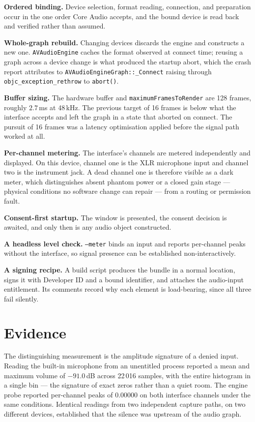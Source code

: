 \documentclass[10pt,letterpaper,twocolumn]{article}
\newcommand{\code}[1]{\texttt{#1}}
\begin{document}
\textbf{Ordered binding.} Device selection, format reading, connection, and preparation occur in the one order Core Audio accepts, and the bound device is read back and verified rather than assumed.

\textbf{Whole-graph rebuild.} Changing devices discards the engine and constructs a new one. \code{AVAudioEngine} caches the format observed at connect time; reusing a graph across a device change is what produced the startup abort, which the crash report attributes to \code{AVAudioEngine\allowbreak Graph::\allowbreak\_Connect} raising through \code{objc\_\allowbreak exception\_\allowbreak rethrow} to \code{abort()}.

\textbf{Buffer sizing.} The hardware buffer and \code{maximum\allowbreak Frames\allowbreak To\allowbreak Render} are 128 frames, roughly $2.7$\,ms at 48\,kHz. The previous target of 16 frames is below what the interface accepts and left the graph in a state that aborted on connect. The pursuit of 16 frames was a latency optimisation applied before the signal path worked at all.

\textbf{Per-channel metering.} The interface's channels are metered independently and displayed. On this device, channel one is the XLR microphone input and channel two is the instrument jack. A dead channel one is therefore visible as a dark meter, which distinguishes absent phantom power or a closed gain stage --- physical conditions no software change can repair --- from a routing or permission fault.

\textbf{Consent-first startup.} The window is presented, the consent decision is awaited, and only then is any audio object constructed.

\textbf{A headless level check.} \code{--meter} binds an input and reports per-channel peaks without the interface, so signal presence can be established non-interactively.

\textbf{A signing recipe.} A build script produces the bundle in a normal location, signs it with Developer ID and a bound identifier, and attaches the audio-input entitlement. Its comments record why each element is load-bearing, since all three fail silently.

\section{Evidence}

The distinguishing measurement is the amplitude signature of a denied input. Reading the built-in microphone from an unentitled process reported a mean and maximum volume of $-91.0$\,dB across 22\,016 samples, with the entire histogram in a single bin --- the signature of exact zeros rather than a quiet room. The engine probe reported per-channel peaks of $0.00000$ on both interface channels under the same conditions. Identical readings from two independent capture paths, on two different devices, established that the silence was upstream of the audio graph.
\end{document}
